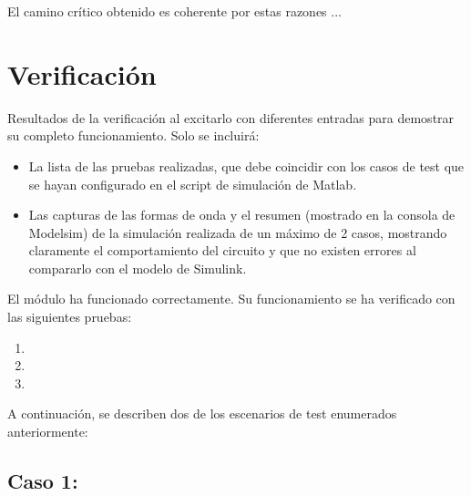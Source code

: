 \documentclass[parskip,a4paper,12pt]{article}
\begin{document}
El camino crítico obtenido es coherente por estas razones ...




\section{Verificación}
\begin{enunciado}{}{}%
Resultados de la verificación al excitarlo con diferentes entradas para demostrar su completo funcionamiento. Solo se incluirá:
\begin{itemize}
    \item La lista de las pruebas realizadas, que debe coincidir con los casos de test que se hayan configurado en el script de simulación de Matlab.
    \item Las capturas de las formas de onda y el resumen (mostrado en la consola de Modelsim) de la simulación realizada de un máximo de 2 casos, mostrando claramente el comportamiento del circuito y que no existen errores al compararlo con el modelo de Simulink.
\end{itemize}

\end{enunciado}

El módulo ha funcionado correctamente. Su funcionamiento se ha verificado con las siguientes pruebas:
\begin{enumerate}
    \item 
    \item 
    \item
\end{enumerate}

A continuación, se describen dos de los escenarios de test enumerados anteriormente:
\subsection{Caso 1: }

\end{document}

